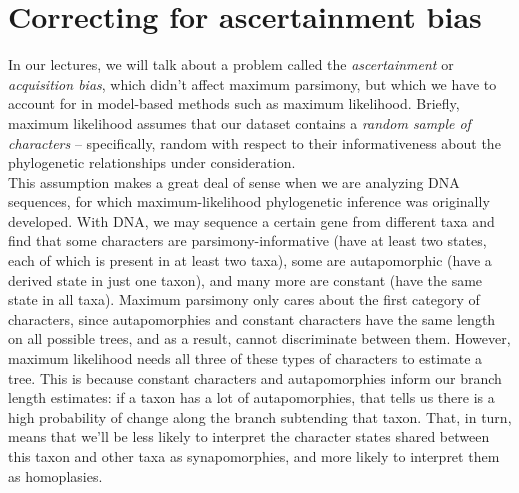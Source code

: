 \documentclass[12pt]{article}
\begin{document}
\section*{Correcting for ascertainment bias}

In our lectures, we will talk about a problem called the \textit{ascertainment} or \textit{acquisition bias}, which didn't affect maximum parsimony, but which we have to account for in model-based methods such as maximum likelihood. Briefly, maximum likelihood assumes that our dataset contains a \textit{random sample of characters} -- specifically, random with respect to their informativeness about the phylogenetic relationships under consideration. \\

\noindent This assumption makes a great deal of sense when we are analyzing DNA sequences, for which maximum-likelihood phylogenetic inference was originally developed. With DNA, we may sequence a certain gene from different taxa and find that some characters are parsimony-informative (have at least two states, each of which is present in at least two taxa), some are autapomorphic (have a derived state in just one taxon), and many more are constant (have the same state in all taxa). Maximum parsimony only cares about the first category of characters, since autapomorphies and constant characters have the same length on all possible trees, and as a result, cannot discriminate between them. However, maximum likelihood needs all three of these types of characters to estimate a tree. This is because constant characters and autapomorphies inform our branch length estimates: if a taxon has a lot of autapomorphies, that tells us there is a high probability of change along the branch subtending that taxon. That, in turn, means that we'll be less likely to interpret the character states shared between this taxon and other taxa as synapomorphies, and more likely to interpret them as homoplasies. \\
\end{document}
